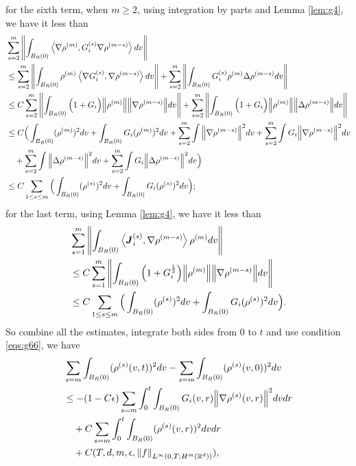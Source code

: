 \documentclass[a4paper, 11pt]{article}
\newcommand{\inner}[2]{\left< #1 , #2 \right>}
\theoremstyle{plain}
\theoremstyle{remark}
\theoremstyle{definition}
\newcommand{\intr}{\int_{B_R(0)}}
\newcommand{\J}{\boldsymbol{J}}
\begin{document}
		for the sixth term, when $m\geq 2$, using integration by parts and Lemma \ref{lem:g4}, we have it less than
		\begin{equation}
			\begin{aligned}
				&\sum_{s=2}^m\norm{\intr \inner{\nabla\rho^{(m)}}{G_i^{(s)}\nabla\rho^{(m-s)}}dv}\\
				&\leq \sum_{s=2}^m\norm{\intr \rho^{(m)}\inner{\nabla G_i^{(s)}}{\nabla\rho^{(m-s)}}dv}+\sum_{s=2}^m\norm{\intr G_i^{(s)}\rho^{(m)}\Delta\rho^{(m-s)}dv}\\
                &\leq C\sum_{s=2}^m\norm{\intr \Big(1+G_i\Big)\norm{\rho^{(m)}}\norm{\nabla\rho^{(m-s)}}dv}+\sum_{s=2}^m\norm{\intr \Big(1+G_i\Big)\norm{\rho^{(m)}}\norm{\Delta\rho^{(m-s)}}dv}\\
				&\leq C\Big(\intr(\rho^{(m)})^2dv+\intr G_i(\rho^{(m)})^2dv+\sum_{s=2}^{m}\int\norm{\nabla \rho^{(m-s)}}^2dv+\sum_{s=2}^m\int G_i\norm{\nabla \rho^{(m-s)}}^2dv\\
				&\quad +\sum_{s=2}^{m}\int\norm{\Delta \rho^{(m-s)}}^2dv+\sum_{s=2}^m\int G_i\norm{\Delta \rho^{(m-s)}}^2dv\Big)\\
				&\leq C\sum_{1\leq s\leq m}\Big(\intr (\rho^{(s)})^2dv+\intr G_i(\rho^{(s)})^2dv\Big);
			\end{aligned}
		\end{equation}
		for the last term, using Lemma \ref{lem:g4}, we have it less than
		\begin{equation}
			\begin{aligned}
				&\sum_{s=1}^m\norm{\intr\inner{\J_i^{(s)}}{\nabla\rho^{(m-s)}}\rho^{(m)}dv}\\
                &\leq C\sum_{s=1}^m\norm{\intr \Big(1+G_i^{\frac{1}{2}}\Big)\norm{\rho^{(m)}}\norm{\nabla\rho^{(m-s)}}dv} \\
                &\leq C\sum_{1\leq s\leq m}\Big(\intr (\rho^{(s)})^2dv+\intr G_i(\rho^{(s)})^2dv\Big).
			\end{aligned}
		\end{equation}
		So combine all the estimates, integrate both sides from $0$ to $t$ and use condition \eqref{eqs:g66}, we have
	\begin{equation}\label{eq:g88}
		\begin{aligned}
			&\sum_{s=m}\intr(\rho^{(s)}(v,t))^2dv-\sum_{s=m}\intr(\rho^{(s)}(v,0))^2dv\\
			&\leq -(1-C\epsilon)\sum_{s=m}\int_0^t\intr G_i(v,r)\norm{\nabla\rho^{(s)}(v,r)}^2dvdr\\
			&\quad+C\sum_{s=m}\int_0^t\intr(\rho^{(s)}(v,r))^2dvdr\\
			&\quad+C(T,d,m,\epsilon,\norm{f}_{L^{\infty}(0,T;H^{m}(\mathbb{R}^d))}),
		\end{aligned}
	\end{equation}
\end{document}

